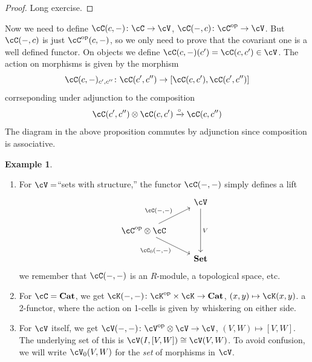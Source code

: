 \documentclass[a4paper,11pt,oneside,openany]{scrbook}
\newcommand{\catname}[1]{{\normalfont\textbf{#1}}}
\newcommand{\Set}{\catname{Set}}
\newcommand{\Cat}{\catname{Cat}}
\newcommand{\from}{\colon}
\newcommand{\iso}{\cong}
\DeclareMathOperator{\op}{\text{op}}
\theoremstyle{definition}
\theoremstyle{definition}
\newtheorem{exmp}[thm]{Example}
\begin{document}
\begin{proof}
    Long exercise.
\end{proof}
Now we need to define $ \cC(c,-) \from \cC \to \cV $, $ \cC(-,c)\from \cC^{\op}\to \cV $.
But $ \cC(-,c) $ is just $ \cC^{\op}(c,-) $, so we only need to prove that the covariant one is a well defined functor.
On objects we define $ \cC(c,-)(c') = \cC(c,c') \in \cV $.
The action on morphisms is given by the morphism
\begin{displaymath}
    \cC(c,-)_{c',c''} \from \cC(c',c'') \to [\cC(c,c'),\cC(c',c'')]
\end{displaymath}
corrseponding under adjunction to the composition
\begin{displaymath}
    \cC(c',c'')\otimes \cC(c,c') \xrightarrow{\circ} \cC(c,c'')
\end{displaymath}
The diagram in the above proposition commutes by adjunction since composition is associative.
\begin{exmp}
    \begin{enumerate}[label=\arabic*)]
	\item
	    For $ \cV =  $``sets with structure,'' the functor $ \cC(-,-) $ simply defines a lift 
	    \begin{displaymath}
	        \begin{tikzcd}
	    	& \cV \arrow[dd, "V"]\\
	    	\cC^{\op}\otimes \cC \arrow[ur, "{\cC(-,-)}"]\arrow[dr, "{\cC_0(-,-)}"'] & \\
	    	& \Set
	        \end{tikzcd}
	    \end{displaymath}
	    we remember that $ \cC(-,-) $ is an $ R $-module, a topological space, etc.
	\item
	    For $ \cC = \Cat $, we get $ \cK(-,-) \from \cK^{\op}\times \cK \to \Cat $, $ (x,y)\mapsto \cK(x,y) $.
	    a 2-functor, where the action on 1-cells is given by whiskering on either side.
	\item
	    For $ \cV $ itself, we get  $ \cV(-,-) \from \cV^{\op}\otimes \cV \to \cV $, $ (V,W)\mapsto [V,W] $.
	    The underlying set of this is $ \cV(I,[V,W]) \iso \cV(V,W) $.
	    To avoid confusion, we will write $ \cV_0(V,W) $ for the \emph{set} of morphisms in $ \cV $.
    \end{enumerate}
\end{exmp}
\end{document}
